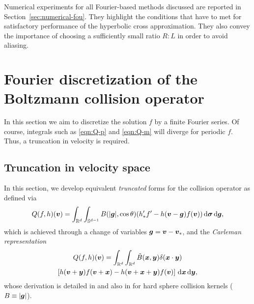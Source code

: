 Numerical experiments for all Fourier-based methods discussed are reported in Section~\ref{sec:numerical-fou}.
They highlight the conditions that have to met for satisfactory performance of the hyperbolic cross
approximation.  They also convey the importance of choosing a sufficiently small ratio $R:L$ in order to avoid
aliasing.

\section[Fourier discretization of the Boltzmann collision operator]{Fourier discretization of the Boltzmann collision operator%
    }
\label{sec:fourier}

In this section we aim to discretize the solution $f$ by a finite Fourier
series. Of course, integrals such as \eqref{eqn:Q-p} and \eqref{eqn:Q-m} will
diverge for periodic $f$. Thus, a truncation in velocity is required.

\subsection{Truncation in velocity space} \label{sec:trunc}

In this section, we develop equivalent {\em truncated} forms for the collision
operator as defined via
\begin{equation} \label{eqn:Q-p}
    Q(f,h)({\bm v}) = \int_{\mathbb{R}^d}\int_{\mathbb{S}^{d-1}} B(|{\bm g}|,\cos\theta)(h_*'f' -
    h({\bm v}-{\bm g})f({\bm v}))\,\mathrm{d}{\bm\sigma} \,\mathrm{d} {\bm g},
\end{equation}
which is achieved through a change of variables ${\bm g}={\bm v}-{\bm v}_*$, and the {\em
Carleman representation}
\begin{multline} \label{eqn:Q-m}
    Q(f,h)({\bm v}) = \int_{\mathbb{R}^d}\int_{\mathbb{R}^d} \tilde{B}({\bm x},{\bm y}) \delta({\bm x}\cdot{\bm y}) \\
    \left[ h({\bm v}+{\bm y})f({\bm v}+{\bm x}) - h({\bm v}+{\bm x}+{\bm y})f({\bm v}) \right] \,\mathrm{d} {\bm x} \,\mathrm{d} {\bm y},
\end{multline}
whose derivation is detailed in \cite{Mouhot06} and also in \cite{Bobylev99} for hard sphere collision
kernels ($B\equiv|{\bm g}|$).

